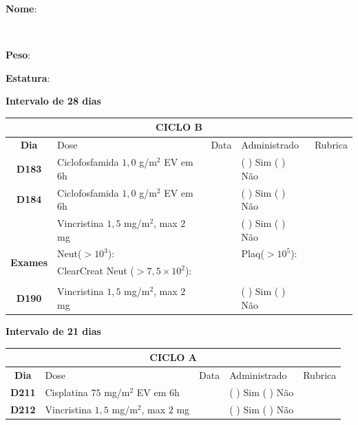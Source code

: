 \documentclass[11pt,a4paper,oldfontcommands]{memoir}
\def\entrywithlabel[#1]#2{\parbox{#1}{{\small #2:} \hrulefill}}
\begin{document}
\begin{center}
    \noindent
\entrywithlabel[1\hsize]{\textbf{Nome}}\hfill
\\[0.3cm]
\entrywithlabel[.45\hsize]{\textbf{Peso}}\hfill  \entrywithlabel[.45\hsize]{\textbf{Estatura}}

    \textbf{Intervalo de 28 dias}
    \begin{table}[H]
    \begin{tabular}{p{1cm}p{6cm}|p{1cm}|p{3cm}|p{2.5cm}}
    \hline
	\multicolumn{5}{c}{\textbf{CICLO B}}\\
	\hline
    \multicolumn{1}{c|}{\multirow{1}{*}{\textbf{Dia}}}&{Dose}&{Data}&{Administrado}&{Rubrica} \\
    \hline
    \multicolumn{1}{c|}{\multirow{1}{*}{\textbf{D183}}}&{Ciclofosfamida \(1,0\) g/m\(^2\) EV em 6h}&&{(  ) Sim (  ) Não}&\\
    \multicolumn{1}{c|}{\multirow{1}{*}{\textbf{D184}}}&{Ciclofosfamida \(1,0\) g/m\(^2\) EV em 6h}&&{(  ) Sim (  ) Não}&\\
    \multicolumn{1}{c|}{\multirow{1}{*}{\textbf{}}}&{Vincristina \(1,5\) mg/m\(^2\), max \(2\) mg}&&{(  ) Sim (  ) Não}&\\
    \hline
    \multicolumn{1}{c|}{\multirow{2}{*}{\textbf{Exames}}}&\multicolumn{2}{l|}{Neut(\(>10^3\)):}&{Plaq(\(>10^5\)):}&\\
    \cline{2-5}
    \multicolumn{1}{c|}{\multirow{2}{*}{{}}}&\multicolumn{2}{l|}{ClearCreat Neut (\(>7,5\times10^2\)):}&{}&{}\\
    \hline
    \\
    \hline
    \multicolumn{1}{c|}{\multirow{1}{*}{\textbf{D190}}}&{Vincristina \(1,5\) mg/m\(^2\), max \(2\) mg}&&{(  ) Sim (  ) Não}&\\
    \hline
\end{tabular}
\end{table}
\textbf{Intervalo de 21 dias}
\begin{table}[H]
\begin{tabular}{p{1cm}p{6cm}|p{1cm}|p{3cm}|p{2.5cm}}
	\hline
	\multicolumn{5}{c}{\textbf{CICLO A}}\\
\hline
    \multicolumn{1}{c|}{\multirow{1}{*}{\textbf{Dia}}}&{Dose}&{Data}&{Administrado}&{Rubrica} \\
    \hline
    \multicolumn{1}{c|}{\multirow{1}{*}{\textbf{D211}}}&{Cisplatina \(75\) mg/m\(^2\) EV em 6h}&&{(  ) Sim (  ) Não}&\\
    \multicolumn{1}{c|}{\multirow{1}{*}{\textbf{D212}}}&{Vincristina \(1,5\) mg/m\(^2\), max \(2\) mg}&&{(  ) Sim (  ) Não}&\\

\end{tabular}
\end{table}
\end{center}
\end{document}
